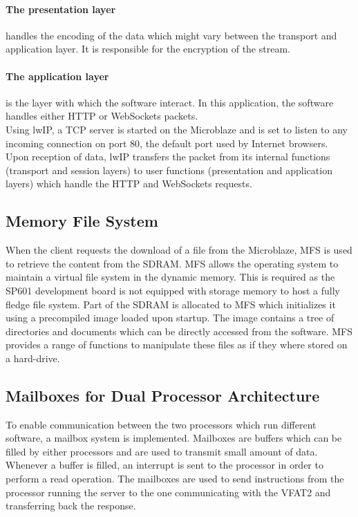       \paragraph{The presentation layer} handles the encoding of the data which might vary between the transport and application layer. It is responsible for the encryption of the stream.

      \paragraph{The application layer} is the layer with which the software interact. In this application, the software handles either HTTP or WebSockets packets. \\

      Using lwIP, a TCP server is started on the Microblaze and is set to listen to any incoming connection on port 80, the default port used by Internet browsers. Upon reception of data, lwIP transfers the packet from its internal functions (transport and session layers) to user functions (presentation and application layers) which handle the HTTP and WebSockets requests.

    \subsection{Memory File System}

      When the client requests the download of a file from the Microblaze, MFS is used to retrieve the content from the SDRAM. MFS allows the operating system to maintain a virtual file system in the dynamic memory. This is required as the SP601 development board is not equipped with storage memory to host a fully fledge file system. Part of the SDRAM is allocated to MFS which initializes it using a precompiled image loaded upon startup. The image contains a tree of directories and documents which can be directly accessed from the software. MFS provides a range of functions to manipulate these files as if they where stored on a hard-drive.

    \subsection{Mailboxes for Dual Processor Architecture}

      To enable communication between the two processors which run different software, a mailbox system is implemented. Mailboxes are buffers which can be filled by either processors and are used to transmit small amount of data. Whenever a buffer is filled, an interrupt is sent to the processor in order to perform a read operation. The mailboxes are used to send instructions from the processor running the server to the one communicating with the VFAT2 and transferring back the response. \\

